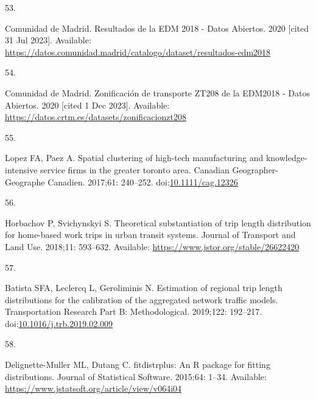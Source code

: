 \documentclass[10pt,letterpaper]{article}
\newlength{\cslhangindent}
\newlength{\csllabelwidth}
\newlength{\cslentryspacingunit} %
\newenvironment{CSLReferences}[2] %
 {%
  \setlength{\parindent}{0pt}
  \ifodd #1
  \let\oldpar\par
  \def\par{\hangindent=\cslhangindent\oldpar}
  \fi
  \setlength{\parskip}{#2\cslentryspacingunit}
 }%
 {}
\newcommand{\CSLLeftMargin}[1]{\parbox[t]{\csllabelwidth}{#1}}
\newcommand{\CSLRightInline}[1]{\parbox[t]{\linewidth - \csllabelwidth}{#1}\break}
\providecommand{\DIFaddbegin}{} %
\providecommand{\DIFaddend}{} %
\providecommand{\DIFdelbegin}{} %
\providecommand{\DIFdelend}{} %
\newcommand{\DIFscaledelfig}{0.5}
\newlength{\DIFdelgraphicswidth} %
\newlength{\DIFdelgraphicsheight} %
\newcommand{\DIFaddincludegraphics}[2][]{{\color{blue}\fbox{\DIFOincludegraphics[#1]{#2}}}} %
\newcommand{\DIFdelincludegraphics}[2][]{%
\sbox{\DIFdelgraphicsbox}{\DIFOincludegraphics[#1]{#2}}%
\settoboxwidth{\DIFdelgraphicswidth}{\DIFdelgraphicsbox} %
\settoboxtotalheight{\DIFdelgraphicsheight}{\DIFdelgraphicsbox} %
\scalebox{\DIFscaledelfig}{%
\parbox[b]{\DIFdelgraphicswidth}{\usebox{\DIFdelgraphicsbox}\\[-\baselineskip] \rule{\DIFdelgraphicswidth}{0em}}\llap{\resizebox{\DIFdelgraphicswidth}{\DIFdelgraphicsheight}{%
\setlength{\unitlength}{\DIFdelgraphicswidth}%
\begin{picture}(1,1)%
\thicklines\linethickness{2pt} %
{\color[rgb]{1,0,0}\put(0,0){\framebox(1,1){}}}%
{\color[rgb]{1,0,0}\put(0,0){\line( 1,1){1}}}%
{\color[rgb]{1,0,0}\put(0,1){\line(1,-1){1}}}%
\end{picture}%
}\hspace*{3pt}}} %
} %
\DeclareRobustCommand{\DIFaddbegin}{\DIFOaddbegin \let\includegraphics\DIFaddincludegraphics} %
\DeclareRobustCommand{\DIFaddend}{\DIFOaddend \let\includegraphics\DIFOincludegraphics} %
\DeclareRobustCommand{\DIFdelbegin}{\DIFOdelbegin \let\includegraphics\DIFdelincludegraphics} %
\DeclareRobustCommand{\DIFdelend}{\DIFOaddend \let\includegraphics\DIFOincludegraphics} %
\begin{document}
\begin{CSLReferences}{0}{0}
\leavevmode{}%
\DIFdelbegin %
\DIFdelend \DIFaddbegin \CSLLeftMargin{53. }\DIFaddend %
\CSLRightInline{Comunidad de Madrid. Resultados de la {EDM} 2018 - Datos
Abiertos. 2020 {[}cited 31 Jul 2023{]}. Available:
\url{https://datos.comunidad.madrid/catalogo/dataset/resultados-edm2018}}

\leavevmode{}%
\DIFdelbegin %
\DIFdelend \DIFaddbegin \CSLLeftMargin{54. }\DIFaddend %
\CSLRightInline{Comunidad de Madrid. Zonificación de transporte ZT208 de
la EDM2018 - Datos Abiertos. 2020 {[}cited 1 Dec 2023{]}. Available:
\url{https://datos.crtm.es/datasets/zonificacionzt208}}

\leavevmode{}%
\DIFdelbegin %
\DIFdelend \DIFaddbegin \CSLLeftMargin{55. }\DIFaddend %
\CSLRightInline{Lopez FA, Paez A. Spatial clustering of high-tech
manufacturing and knowledge-intensive service firms in the greater
toronto area. Canadian Geographer-Geographe Canadien. 2017;61: 240--252.
doi:\href{https://doi.org/10.1111/cag.12326}{10.1111/cag.12326}}

\leavevmode{}%
\DIFdelbegin %
\DIFdelend \DIFaddbegin \CSLLeftMargin{56. }\DIFaddend %
\CSLRightInline{Horbachov P, Svichynskyi S. Theoretical substantiation
of trip length distribution for home-based work trips in urban transit
systems. Journal of Transport and Land Use. 2018;11: 593--632.
Available: \url{https://www.jstor.org/stable/26622420}}

\leavevmode{}%
\DIFdelbegin %
\DIFdelend \DIFaddbegin \CSLLeftMargin{57. }\DIFaddend %
\CSLRightInline{Batista SFA, Leclercq L, Geroliminis N. Estimation of
regional trip length distributions for the calibration of the aggregated
network traffic models. Transportation Research Part B: Methodological.
2019;122: 192--217.
doi:\href{https://doi.org/10.1016/j.trb.2019.02.009}{10.1016/j.trb.2019.02.009}}

\leavevmode{}%
\DIFdelbegin %
\DIFdelend \DIFaddbegin \CSLLeftMargin{58. }\DIFaddend %
\CSLRightInline{Delignette-Muller ML, Dutang C. {fitdistrplus}: An {R}
package for fitting distributions. Journal of Statistical Software.
2015;64: 1--34. Available:
\url{https://www.jstatsoft.org/article/view/v064i04}}


\end{CSLReferences}
\end{document}

